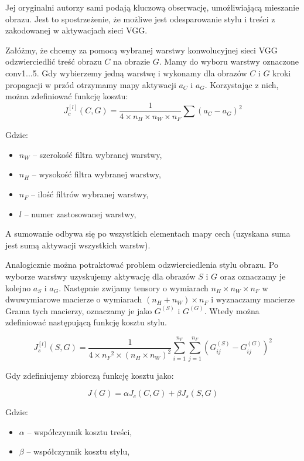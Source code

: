 Jej oryginalni autorzy sami podają kluczową obserwację, umożliwiającą mieszanie obrazu. Jest to spostrzeżenie, że możliwe jest odesparowanie stylu
i treści z zakodowanej w aktywacjach sieci VGG.

Załóżmy, że chcemy za pomocą wybranej warstwy konwolucyjnej sieci VGG odzwierciedlić treść obrazu \(C\) na obrazie \(G\). Mamy do wyboru warstwy oznaczone conv1...5.
Gdy wybierzemy jedną warstwę i wykonamy dla obrazów \(C\) i \(G\) kroki propagacji w przód otrzymamy mapy aktywacji \(a_{C}\) i \(a_{G}\). Korzystając z nich, można zdefiniować
funkcję kosztu: \[J_{c}^{[l]}(C, G) = \frac{1}{4 \times n_H \times n_W \times n_F} \sum{(a_{C} - a_{G})^{2}} \]

Gdzie:

\begin{itemize}
\item
    \(n_{W}\) -- szerokość filtra wybranej warstwy,
\item
    \(n_{H}\) -- wysokość filtra wybranej warstwy,
\item
    \(n_{F}\) -- ilość filtrów wybranej warstwy,
\item
    \(l\) -- numer zastosowanej warstwy,
\end{itemize}

A sumowanie odbywa się po wszystkich elementach mapy cech (uzyskana suma jest sumą aktywacji wszystkich warstw). 

Analogicznie można potraktować problem odzwierciedlenia stylu obrazu. Po wyborze warstwy uzyskujemy aktywację dla obrazów \(S\) i \(G\) oraz oznaczamy je kolejno \(a_{S}\) i \(a_{G}\). 
Następnie zwijamy tensory o wymiarach \(n_H \times n_W \times n_F\) w dwuwymiarowe macierze o wymiarach \((n_H + n_W) \times n_F\) i wyznaczamy macierze Grama tych macierzy, oznaczamy je jako 
\(G^{(S)}\) i \(G^{(G)}\). Wtedy można zdefiniować następującą funkcję kosztu stylu.

\[J_{s}^{[l]}(S,G) = \frac{1}{4 \times {n_F}^2 \times (n_H \times n_W)^2} \sum _{i=1}^{n_F}\sum_{j=1}^{n_F}(G^{(S)}_{ij} - G^{(G)}_{ij})^2\tag{2}\]

Gdy zdefiniujemy zbiorczą funkcję kosztu jako:

\[J(G) = \alpha J_{c}(C,G) + \beta J_{s}(S,G)\]

Gdzie:
\begin{itemize}
\item
    \(\alpha\) -- współczynnik kosztu treści,
\item
    \(\beta\) -- współczynnik kosztu stylu,
\end{itemize}


